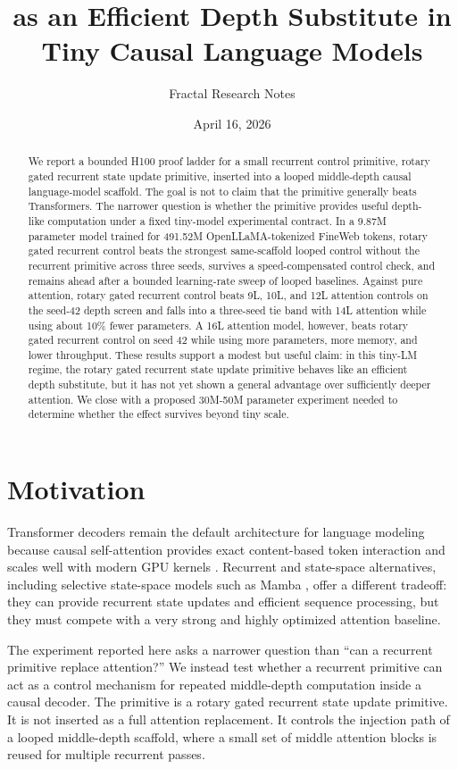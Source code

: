 \documentclass[11pt]{article}
\title{\Primitive{} as an Efficient Depth Substitute in Tiny Causal Language Models}
\author{Fractal Research Notes}
\date{April 16, 2026}
\newcommand{\primitive}{rotary gated recurrent state update primitive}
\newcommand{\primitivecontrol}{rotary gated recurrent control}
\begin{document}
\maketitle

\begin{abstract}
We report a bounded H100 proof ladder for a small recurrent control primitive,
\primitive{}, inserted into a looped middle-depth causal language-model
scaffold.
The goal is not to claim that the primitive generally beats Transformers.
The narrower question is whether the primitive provides useful depth-like
computation under a fixed tiny-model experimental contract. In a 9.87M
parameter model trained for 491.52M OpenLLaMA-tokenized FineWeb tokens,
\primitivecontrol{} beats the strongest same-scaffold looped control without
the recurrent primitive across three seeds, survives a speed-compensated
control check, and remains ahead after a bounded learning-rate sweep of looped
baselines. Against pure attention, \primitivecontrol{} beats 9L, 10L, and 12L
attention controls on the seed-42 depth screen and falls into a three-seed tie
band with 14L attention while using about 10\% fewer parameters. A 16L
attention model, however, beats \primitivecontrol{} on seed 42 while using more
parameters, more memory, and lower throughput. These results support a modest
but useful claim: in this tiny-LM regime, the \primitive{} behaves like an
efficient depth substitute, but it has not yet shown a general advantage over
sufficiently deeper attention. We close with a proposed 30M-50M parameter
experiment needed to determine whether the effect survives beyond tiny scale.
\end{abstract}

\section{Motivation}

Transformer decoders remain the default architecture for language modeling
because causal self-attention provides exact content-based token interaction
and scales well with modern GPU kernels \cite{vaswani2017attention,
dao2022flashattention}. Recurrent and state-space alternatives, including
selective state-space models such as Mamba \cite{gu2023mamba}, offer a
different tradeoff: they can provide recurrent state updates and efficient
sequence processing, but they must compete with a very strong and highly
optimized attention baseline.

The experiment reported here asks a narrower question than ``can a recurrent
primitive replace attention?'' We instead test whether a recurrent primitive
can act as a control mechanism for repeated middle-depth computation inside a
causal decoder. The primitive is a \primitive{}. It is not inserted as a full
attention replacement. It controls the injection path of a looped middle-depth
scaffold, where a small set of middle attention blocks is reused for multiple
recurrent passes.
\end{document}
